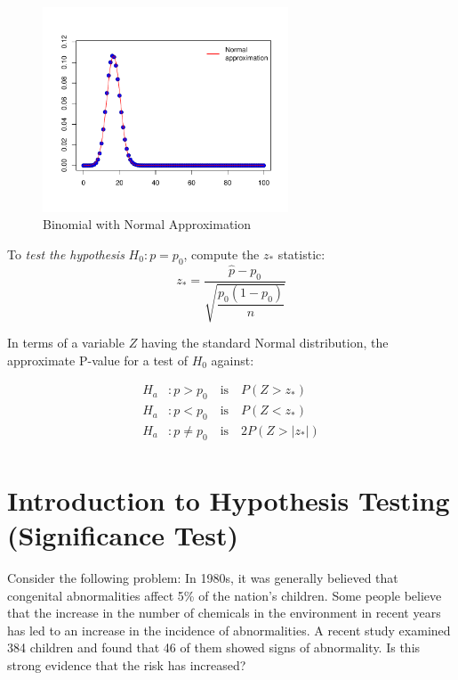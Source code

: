 \begin{figure}[H]
  \centering
  \includegraphics[width=0.65\textwidth]{section11/images/binomial_normal_approximation.pdf}
  \vspace{-2em} %
\captionsetup{skip=0pt}
  \caption{Binomial with Normal Approximation}
\end{figure}
\begin{tcolorbox}[title=\textbf{Hypotheses Tests for a Proportion},
colback=yellow!10,
colframe=black!45,
coltitle=black,
fonttitle=\bfseries,
breakable]

To \textit{test the hypothesis} $H_0 : p = p_0$, compute the $z_\ast$ statistic:
\[
z_\ast = \frac{\hat{p} - p_0}{\sqrt{\dfrac{p_0(1 - p_0)}{n}}}
\]

In terms of a variable $Z$ having the standard Normal distribution, the approximate P-value for a test of $H_0$ against:

\begin{align*}
H_a &: p > p_0 \quad \text{is} \quad P(Z > z_\ast) \\
H_a &: p < p_0 \quad \text{is} \quad P(Z < z_\ast) \\
H_a &: p \ne p_0 \quad \text{is} \quad 2P(Z > |z_\ast|) \\
\end{align*}

\end{tcolorbox}
\section*{Introduction to Hypothesis Testing (Significance Test)}

Consider the following problem: In 1980s, it was generally believed that congenital abnormalities affect 5\% of the nation’s children. Some people believe that the increase in the number of chemicals in the environment in recent years has led to an increase in the incidence of abnormalities. A recent study examined 384 children and found that 46 of them showed signs of abnormality. Is this strong evidence that the risk has increased?

